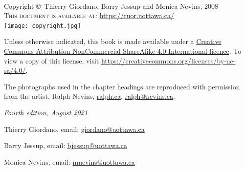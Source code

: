 \documentclass[11pt]{book} %
\begin{document}

\newpage
~\vfill
\thispagestyle{empty}

\noindent Copyright \copyright\ Thierry Giordano, Barry Jessup and Monica Nevins, 2008\\ %


\noindent \textsc{This document is available at:} \href{https://ruor.uottawa.ca/handle/10393/43430}{https://ruor.uottawa.ca/}\\%



\noindent \texttt{[image: copyright.jpg]}

\noindent Unless otherwise indicated, this book is made available under a \href{https://creativecommons.org/licenses/by-nc-sa/4.0/}{Creative Commons Attribution-NonCommercial-ShareAlike 4.0 International licence}.  To view a copy of this license, visit \url{https://creativecommons.org/licenses/by-nc-sa/4.0/}.

\noindent The photographs used in the chapter headings are reproduced with permission from the artist, Ralph Nevins, \url{ralph.ca}, \href{mailto:ralph@nevins.ca}{ralph@nevins.ca}.

\vspace{1in}

\noindent \textit{Fourth edition, August 2021} %




\smallskip
\noindent Thierry Giordano, email:
\href{mailto:giordano@uottawa.ca}{giordano@uottawa.ca}



\smallskip
\noindent Barry Jessup, email:
\href{mailto:bjessup@uottawa.ca}{bjessup@uottawa.ca}


\smallskip

\noindent Monica Nevins, email:
\href{mailto:mnevins@uottawa.ca}{mnevins@uottawa.ca}




\end{document}
